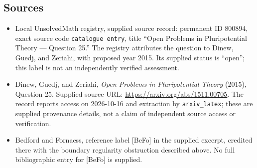 \documentclass[11pt]{article}
\begin{document}
\subsection{Sources}
\begin{itemize}
\item Local UnsolvedMath registry, supplied source record: permanent ID \(800894\), exact source code \texttt{catalogue entry}, title ``Open Problems in Pluripotential Theory --- Question 25.'' The registry attributes the question to Dinew, Guedj, and Zeriahi, with proposed year 2015. Its supplied status is ``open''; this label is not an independently verified assessment.
\item Dinew, Guedj, and Zeriahi, \emph{Open Problems in Pluripotential Theory} (2015), Question 25. Supplied source URL: \url{https://arxiv.org/abs/1511.00705}. The record reports access on 2026-10-16 and extraction by \texttt{arxiv\_latex}; these are supplied provenance details, not a claim of independent source access or verification.
\item Bedford and Fornaess, reference label [BeFo] in the supplied excerpt, credited there with the boundary regularity obstruction described above. No full bibliographic entry for [BeFo] is supplied.
\end{itemize}
\end{document}
